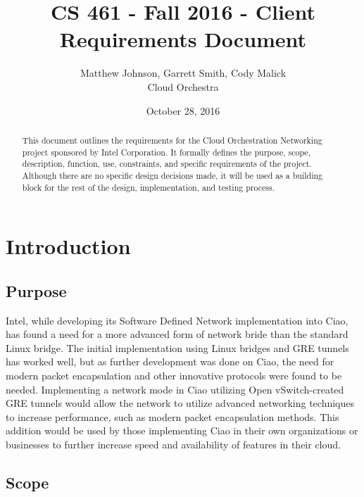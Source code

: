 \documentclass[10pt,letterpaper,onecolumn,draftclsnofoot]{IEEEtran}
\begin{document}
\begin{titlepage}
	\title{CS 461 - Fall 2016 - Client Requirements Document}
	\author{Matthew Johnson, Garrett Smith, Cody Malick\\Cloud Orchestra}
	\date{October 28, 2016}
	\maketitle
	\vspace{4cm}
	\begin{abstract}
		\noindent This document outlines the requirements for the Cloud Orchestration
		Networking project sponsored by Intel Corporation. It formally defines the
		purpose, scope, description, function, use, constraints, and specific
		requirements of the project. Although there are no specific design decisions
		made, it will be used as a building block for the rest of the design,
		implementation, and testing process.

	\end{abstract}

\end{titlepage}
\tableofcontents
\clearpage

\section{Introduction}

\subsection{Purpose}

Intel, while developing its Software Defined Network implementation into Ciao, has found
a need for a more advanced form of network bride than the standard Linux bridge. The initial
implementation using Linux bridges and GRE tunnels has worked well, but as further development was
done on Ciao, the need for modern packet encapsulation and other innovative protocols were found to
be needed. Implementing a network mode in Ciao utilizing Open vSwitch-created GRE tunnels would
allow the network to utilize advanced networking techniques to increase performance, such as
modern packet encapsulation methods. This addition would be used by those implementing Ciao in
their own organizations or businesses to further increase speed and availability of features in
their cloud.

\subsection{Scope}
\end{document}
